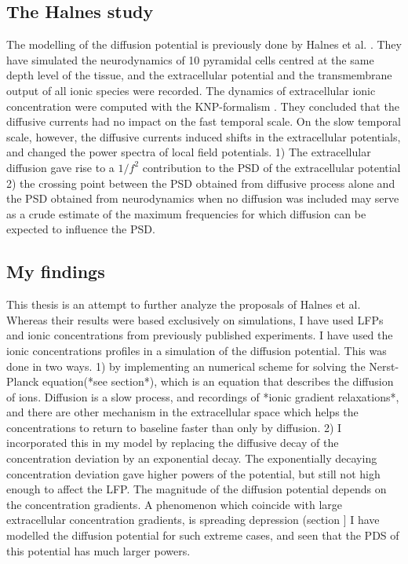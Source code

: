 \documentclass{article}
\begin{document}
\subsection{The Halnes study}
The modelling of the diffusion potential is previously done by Halnes et al. \cite{Halnes2016}. They have simulated the neurodynamics of 10 pyramidal cells centred at the same depth level of the tissue, and the extracellular potential and the transmembrane output of all ionic species were recorded. The dynamics of extracellular ionic concentration were computed with the KNP-formalism \cite{Halnes}. They concluded that the diffusive currents had no impact on the fast temporal scale. On the slow temporal scale, however, the diffusive currents induced shifts in the extracellular potentials, and changed the power spectra of local field potentials.  1) The extracellular diffusion gave rise to a $1/f^2$ contribution to the PSD of the extracellular potential 2) the crossing point between the PSD obtained from diffusive process alone and the PSD obtained from neurodynamics when no diffusion was included may serve as a crude estimate of the maximum frequencies for which diffusion can be expected to influence the PSD. 

\subsection{My findings}

This thesis is an attempt to further analyze the proposals of Halnes et al. Whereas their results were based exclusively on simulations, I have used LFPs and ionic concentrations from previously published experiments. I have used the ionic concentrations profiles in a simulation of the diffusion potential. This was done in two ways. 1) by implementing an numerical scheme for solving the Nerst-Planck equation(*see section*), which is an equation that describes the diffusion of ions. Diffusion is a slow process, and recordings of *ionic gradient relaxations*, and there are other mechanism in the extracellular space which helps the concentrations to return to baseline faster than only by diffusion. 2)  I incorporated this in my model by replacing the diffusive decay of the concentration deviation by an exponential decay. The exponentially decaying concentration deviation gave higher powers of the potential, but still not high enough to affect the LFP. The magnitude of the diffusion potential depends on the concentration gradients. A phenomenon which coincide with large extracellular concentration gradients, is spreading depression (section ] I have modelled the diffusion potential for such extreme cases, and seen that the PDS of this potential has much larger powers. 
 
\end{document}
